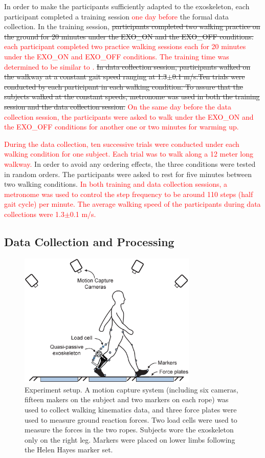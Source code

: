 \documentclass[twocolumn,cleanfoot,10pt]{asme2ej}
\begin{document}
In order to make the participants sufficiently adapted to the exoskeleton, each participant completed a training session \textcolor{red}{one day before} the formal data collection.
In the training session, \sout{participants completed two walking practice on the ground for 20 minutes under the EXO\_ON and the EXO\_OFF conditions.} \textcolor{red}{each participant completed two practice walking sessions each for 20 minutes under the EXO\_ON and EXO\_OFF conditions.
The training time was determined to be similar to \cite{RN5}.}
\sout{In data collection session, participants walked on the walkway at a constant gait speed ranging at 1.3$\pm$0.1 m/s.Ten trials were conducted by each participant in each walking condition. To assure that the subjects walked at the constant speeds, metronome was used in both the training session and the data collection session.}
\textcolor{red}{On the same day before the data collection session, the participants were asked to walk under the EXO\_ON and the EXO\_OFF conditions for another one or two minutes for warming up.}

\textcolor{red}{During the data collection, ten successive trials were conducted under each walking condition for one subject.
Each trial was to walk along a 12 meter long walkway.}
In order to avoid any ordering effects, the three conditions were tested in random orders.
The participants were asked to rest for five minutes between two walking conditions.
\textcolor{red}{In both training and data collection sessions, a metronome was used to control the step frequency to be around 110 steps (half gait cycle) per minute.
The average walking speed of the participants during data collections were 1.3$\pm$0.1 m/s.}

\subsection{Data Collection and Processing}

\begin{figure}[bt]
	\centering
	\includegraphics[width=8.5cm]{environment.eps}
	\caption{Experiment setup.
	A motion capture system (including six cameras, fifteen makers on the subject and two markers on each rope) was used to collect walking kinematics data, and three force plates were used to measure ground reaction forces.
	Two load cells were used to measure the forces in the two ropes.
	Subjects wore the exoskeleton only on the right leg.
	Markers were placed on lower limbs following the Helen Hayes marker set.}
	\label{fig:Environment}
\end{figure}
\end{document}
